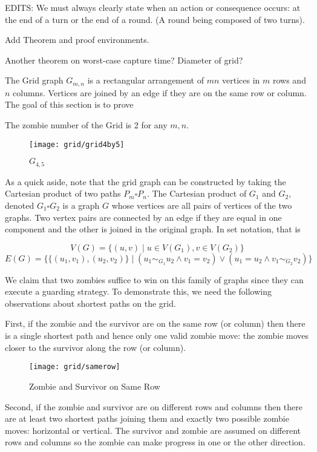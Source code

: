 EDITS: We must always clearly state when an action or consequence occurs: at the end of a turn
or the end of a round. (A round being composed of two turns).

Add Theorem and proof environments.

Another theorem on worst-case capture time? Diameter of grid?

The Grid graph $G_{m,n}$ is a rectangular arrangement of $mn$ vertices in
$m$ rows and $n$ columns. Vertices are joined by an edge if they are on the same
row or column. The goal of this section is to prove

\begin{theorem} The zombie number of the Grid is 2 for any $m, n$.
\end{theorem}

\begin{figure}[h]
  \centering
  \texttt{[image: grid/grid4by5]}
  \caption{$G_{4,5}$}
\end{figure}

As a quick aside, note that the grid graph can be constructed by taking the
Cartesian product of two paths $P_m \square P_n$.
The Cartesian product of $G_1$ and $G_2$, denoted $G_1 \square G_2$ is a graph $G$ whose
 vertices are all pairs of vertices of the two graphs.
Two vertex pairs are connected by an edge if they are equal in one component and
the other is joined in the original graph. In set notation, that is

\[V(G) = \{ (u, v) \mid u \in V(G_1), v \in V(G_2) \} \]
\[E(G) = \{ \{(u_1, v_1), (u_2, v_2) \} \mid (u_1 \sim_{G_1} u_2 \land v_1 = v_2) \lor (u_1 = u_2 \land v_1 \sim_{G_2} v_2) \} \]

We claim that two zombies suffice to win on this family of graphs since they can execute
a guarding strategy. To demonstrate this, we need the following observations about shortest
paths on the grid.

First, if the zombie and the survivor are on the same row (or column) then there is a
single shortest path and hence only one valid zombie move: the zombie moves
closer to the survivor along the row (or column).

\begin{figure}[h]
  \centering
  \texttt{[image: grid/samerow]}
  \caption{Zombie and Survivor on Same Row}
\end{figure}

Second, if the zombie and survivor are on different rows and columns then
 there are at least two shortest paths joining them and exactly
 two possible zombie moves: horizontal or vertical.
The survivor and zombie are assumed on different rows and columns
so the zombie can make progress in one or the other direction.

